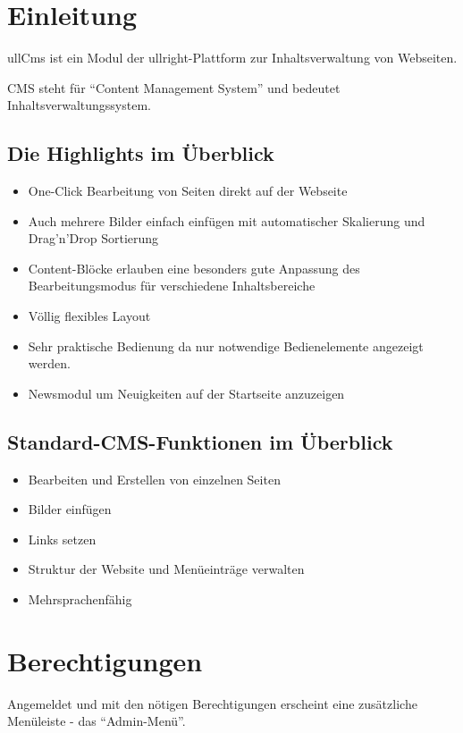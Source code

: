 \documentclass[article, a4paper, oneside, 11pt]{memoir}
\begin{document}
\section{Einleitung}
ullCms ist ein Modul der ullright-Plattform zur Inhaltsverwaltung von Webseiten. 

CMS steht für "`Content Management System"' und bedeutet Inhaltsverwaltungssystem.

\subsection{Die Highlights im Überblick}

\begin{itemize}
\item One-Click Bearbeitung von Seiten direkt auf der Webseite
\item Auch mehrere Bilder einfach einfügen mit automatischer Skalierung und Drag'n'Drop Sortierung
\item Content-Blöcke erlauben eine besonders gute Anpassung des Bearbeitungsmodus für verschiedene Inhaltsbereiche
\item Völlig flexibles Layout 
\item Sehr praktische Bedienung da nur notwendige Bedienelemente angezeigt werden.
\item Newsmodul um Neuigkeiten auf der Startseite anzuzeigen
\end{itemize}

\subsection{Standard-CMS-Funktionen im Überblick}

\begin{itemize}
\item Bearbeiten und Erstellen von einzelnen Seiten
\item Bilder einfügen
\item Links setzen
\item Struktur der Website und Menüeinträge verwalten
\item Mehrsprachenfähig
\end{itemize}




\section{Berechtigungen}

Angemeldet und mit den nötigen Berechtigungen erscheint eine zusätzliche Menüleiste - das "`Admin-Menü"'. 
\end{document}
